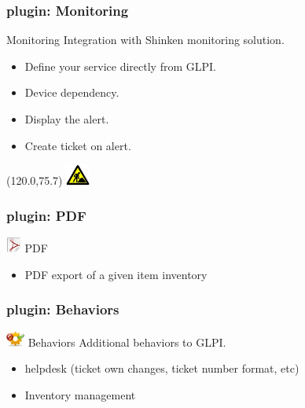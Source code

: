 \documentclass{beamer}
\newcommand{\WorkInProgress}{%
\begin{textblock}{14}(120.0,75.7)
\includegraphics[height=0.7cm]{./pics/workinprogress.jpg}
\end{textblock}
  }
\begin{document}
\begin{frame}
    \frametitle{plugin: Monitoring}
    
    \begin{block}{Monitoring}
        Integration with Shinken monitoring solution.
        \begin{itemize}
            \item Define your service directly from GLPI.
            \item Device dependency.
            \item Display the alert.
            \item Create ticket on alert.
        \end{itemize}
    \end{block}
\WorkInProgress
\end{frame}

\begin{frame}
    \frametitle{plugin: PDF}
    
    \begin{block}{\includegraphics[height=0.5cm]{./pics/plugins/pdf.jpg} PDF}
        \begin{itemize}
            \item PDF export of a given item inventory 
        \end{itemize}
    \end{block}

\end{frame}

\begin{frame}
    \frametitle{plugin: Behaviors}
    
    \begin{block}{\includegraphics[height=0.5cm]{./pics/plugins/behaviors.jpg} Behaviors}
        Additional behaviors to GLPI.
        \begin{itemize}
            \item helpdesk (ticket own changes, ticket number format, etc)
            \item Inventory management
        \end{itemize}
    \end{block}

\end{frame}
\end{document}

